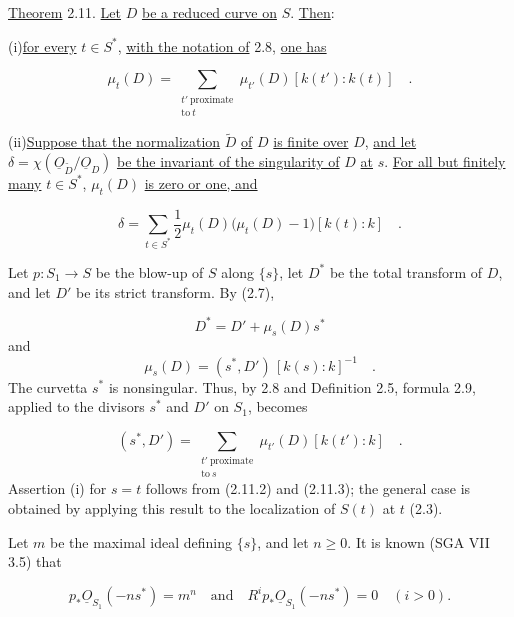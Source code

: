 
\underline{Theorem} 2.11. \underline{Let} $D$ \underline{be a reduced curve on}
$S$. \underline{Then}:

(i)\quad \underline{for every} $t\in S^*$, \underline{with the notation of} 2.8,
\underline{one has}

\begin{equation*}
\mu_t(D)
=\sum_{\substack{t'\ \mathrm{proximate}\\\mathrm{to}\ t}}
\mu_{t'}(D)[k(t'):k(t)] \quad .
\end{equation*}

(ii)\quad \underline{Suppose that the normalization} $\widetilde D$
\underline{of} $D$ \underline{is finite over} $D$, \underline{and let}
$\delta=\chi(\underline{O}_{\widetilde D}/\underline{O}_D)$
\underline{be the invariant of the singularity of} $D$ \underline{at} $s$.
\underline{For all but finitely many} $t\in S^*$, $\mu_t(D)$ \underline{is zero
or one, and}

\begin{equation*}
\delta
=\sum_{t\in S^*}\frac12\mu_t(D)\bigl(\mu_t(D)-1\bigr)[k(t):k] \quad .
\end{equation*}

Let $p:S_1\longrightarrow S$ be the blow-up of $S$ along $\{s\}$, let $D^*$ be
the total transform of $D$, and let $D'$ be its strict transform.  By (2.7),

\begin{equation}\tag{2.11.1}
D^*=D'+\mu_s(D)s^*
\end{equation}
and
\begin{equation}\tag{2.11.2}
\mu_s(D)=(s^*,D')\,[k(s):k]^{-1} \quad .
\end{equation}
The curvetta $s^*$ is nonsingular.  Thus, by 2.8 and Definition 2.5, formula 2.9,
applied to the divisors $s^*$ and $D'$ on $S_1$, becomes

\begin{equation}\tag{2.11.3}
(s^*,D')
=\sum_{\substack{t'\ \mathrm{proximate}\\\mathrm{to}\ s}}
\mu_{t'}(D)[k(t'):k] \quad .
\end{equation}
Assertion (i) for $s=t$ follows from (2.11.2) and (2.11.3); the general case is
obtained by applying this result to the localization of $S(t)$ at $t$ (2.3).

Let $m$ be the maximal ideal defining $\{s\}$, and let $n\geq0$.  It is known
(SGA VII 3.5) that

\begin{equation}\tag{2.11.4}
p_*\underline{O}_{S_1}(-ns^*)=m^n
\quad\text{and}\quad
R^ip_*\underline{O}_{S_1}(-ns^*)=0\quad(i>0).
\end{equation}

